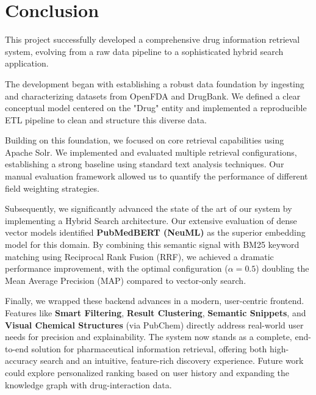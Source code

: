 \section{Conclusion}
\label{sec:conclusion}

This project successfully developed a comprehensive drug information retrieval system, evolving from a raw data pipeline to a sophisticated hybrid search application.

The development began with establishing a robust data foundation by ingesting and characterizing datasets from OpenFDA and DrugBank. We defined a clear conceptual model centered on the "Drug" entity and implemented a reproducible ETL pipeline to clean and structure this diverse data.

Building on this foundation, we focused on core retrieval capabilities using Apache Solr. We implemented and evaluated multiple retrieval configurations, establishing a strong baseline using standard text analysis techniques. Our manual evaluation framework allowed us to quantify the performance of different field weighting strategies.

Subsequently, we significantly advanced the state of the art of our system by implementing a Hybrid Search architecture. Our extensive evaluation of dense vector models identified \textbf{PubMedBERT (NeuML)} as the superior embedding model for this domain. By combining this semantic signal with BM25 keyword matching using Reciprocal Rank Fusion (RRF), we achieved a dramatic performance improvement, with the optimal configuration ($\alpha=0.5$) doubling the Mean Average Precision (MAP) compared to vector-only search.

Finally, we wrapped these backend advances in a modern, user-centric frontend. Features like \textbf{Smart Filtering}, \textbf{Result Clustering}, \textbf{Semantic Snippets}, and \textbf{Visual Chemical Structures} (via PubChem) directly address real-world user needs for precision and explainability. The system now stands as a complete, end-to-end solution for pharmaceutical information retrieval, offering both high-accuracy search and an intuitive, feature-rich discovery experience. Future work could explore personalized ranking based on user history and expanding the knowledge graph with drug-interaction data.
